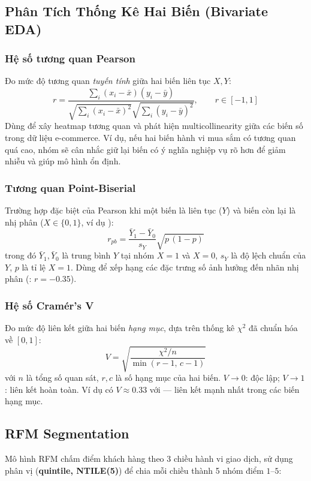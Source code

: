 \documentclass[12pt,a4paper]{article}
\newcommand{\code}[1]{\begingroup\small\ttfamily\seqsplit{#1}\endgroup}
\begin{document}
\subsection{Phân Tích Thống Kê Hai Biến (Bivariate EDA)}

\subsubsection{Hệ số tương quan Pearson}

Đo mức độ tương quan \emph{tuyến tính} giữa hai biến liên tục $X, Y$:
\[
  r = \dfrac{\sum_{i}(x_i - \bar{x})(y_i - \bar{y})}{\sqrt{\sum_i (x_i-\bar{x})^2}\sqrt{\sum_i (y_i-\bar{y})^2}}, \qquad r \in [-1, 1]
\]
Dùng để xây heatmap tương quan và phát hiện multicollinearity giữa các biến số trong dữ liệu
e-commerce. Ví dụ, nếu hai biến hành vi mua sắm có tương quan quá cao, nhóm sẽ cân nhắc giữ lại
biến có ý nghĩa nghiệp vụ rõ hơn để giảm nhiễu và giúp mô hình ổn định.

\subsubsection{Tương quan Point-Biserial}

Trường hợp đặc biệt của Pearson khi một biến là liên tục ($Y$) và biến còn lại là nhị phân ($X \in
\{0,1\}$, ví dụ \code{Churn}):
\[
  r_{pb} = \dfrac{\bar{Y}_1 - \bar{Y}_0}{s_Y}\sqrt{p\,(1-p)}
\]
trong đó $\bar{Y}_1,\bar{Y}_0$ là trung bình $Y$ tại nhóm $X=1$ và $X=0$, $s_Y$ là độ lệch chuẩn
của $Y$, $p$ là tỉ lệ $X=1$. Dùng để xếp hạng các đặc trưng số ảnh hưởng đến nhãn nhị phân
(\code{Tenure}: $r=-0.35$).

\subsubsection{Hệ số Cramér's V}

Đo mức độ liên kết giữa hai biến \emph{hạng mục}, dựa trên thống kê $\chi^2$ đã chuẩn hóa về
$[0,1]$:
\[
  V = \sqrt{\dfrac{\chi^2 / n}{\min(r-1,\, c-1)}}
\]
với $n$ là tổng số quan sát, $r, c$ là số hạng mục của hai biến. $V \to 0$: độc lập; $V \to 1$:
liên kết hoàn toàn. Ví dụ \code{Complain} có $V \approx 0.33$ với \code{Churn} --- liên kết mạnh
nhất trong các biến hạng mục.

\subsection{RFM Segmentation}

Mô hình RFM chấm điểm khách hàng theo 3 chiều hành vi giao dịch, sử dụng phân vị (\textbf{quintile,
NTILE(5)}) để chia mỗi chiều thành 5 nhóm điểm $1$--$5$:
\end{document}
